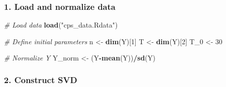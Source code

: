 \documentclass[
]{article}
\newenvironment{Shaded}{\begin{snugshade}}{\end{snugshade}}
\newcommand{\CommentTok}[1]{\textcolor[rgb]{0.56,0.35,0.01}{\textit{#1}}}
\newcommand{\DecValTok}[1]{\textcolor[rgb]{0.00,0.00,0.81}{#1}}
\newcommand{\KeywordTok}[1]{\textcolor[rgb]{0.13,0.29,0.53}{\textbf{#1}}}
\newcommand{\NormalTok}[1]{#1}
\newcommand{\OperatorTok}[1]{\textcolor[rgb]{0.81,0.36,0.00}{\textbf{#1}}}
\newcommand{\StringTok}[1]{\textcolor[rgb]{0.31,0.60,0.02}{#1}}
\begin{document}
\hypertarget{load-and-normalize-data}{%
\subsubsection{1. Load and normalize
data}\label{load-and-normalize-data}}

\begin{Shaded}
\begin{Highlighting}[]
\CommentTok{# Load data}
\KeywordTok{load}\NormalTok{(}\StringTok{"cps_data.Rdata"}\NormalTok{)}

\CommentTok{# Define initial parameters}
\NormalTok{n <-}\StringTok{ }\KeywordTok{dim}\NormalTok{(Y)[}\DecValTok{1}\NormalTok{]}
\NormalTok{T <-}\StringTok{ }\KeywordTok{dim}\NormalTok{(Y)[}\DecValTok{2}\NormalTok{]}
\NormalTok{T_}\DecValTok{0}\NormalTok{ <-}\StringTok{ }\DecValTok{30}

\CommentTok{# Normalize Y}
\NormalTok{Y_norm <-}\StringTok{ }\NormalTok{(Y}\OperatorTok{-}\KeywordTok{mean}\NormalTok{(Y))}\OperatorTok{/}\KeywordTok{sd}\NormalTok{(Y)}
\end{Highlighting}
\end{Shaded}

\hypertarget{construct-svd}{%
\subsubsection{2. Construct SVD}\label{construct-svd}}

\begin{Shaded}
\end{Shaded}
\end{document}
